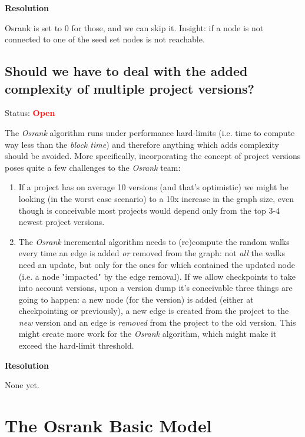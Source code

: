 \documentclass{article}
\begin{document}
\textbf{Resolution}

Osrank is set to 0 for those, and we can skip it.
Insight: if a node is not connected to one of the seed
set nodes is not reachable.

\subsection{ Should we have to deal with the added complexity of multiple project versions? }

Status: \textcolor{red}{\textbf{Open}}

The \textit{Osrank} algorithm runs under performance hard-limits (i.e. time to compute
way less than the \textit{block time}) and therefore anything which adds complexity
should be avoided. More specifically, incorporating the concept of project versions poses
quite a few challenges to the \textit{Osrank} team:

\begin{enumerate}
\item If a project has on average 10 versions (and that's optimistic) we might be
      looking (in the worst case scenario) to a 10x increase in the graph size, even
      though is conceivable most projects would depend only from the top 3-4 newest
      project versions.
\item The \textit{Osrank} incremental algorithm needs to (re)compute the random walks
      every time an edge is added \textit{or} removed from the graph: not
      \textit{all} the walks need an update, but only for the ones for which
      contained the updated node (i.e. a node "impacted" by the edge removal). If we
      allow checkpoints to take into account versions, upon a version dump it's
      conceivable three things are going to happen: a new node (for the version) is added
      (either at checkpointing or previously), a new edge is created from the project to
      the \textit{new} version and an edge is \textit{removed} from the project to the
      old version. This might create more work for the \textit{Osrank} algorithm, which
      might make it exceed the hard-limit threshold.
\end{enumerate}

\textbf{Resolution}

None yet.

\section{The Osrank Basic Model}
\end{document}
